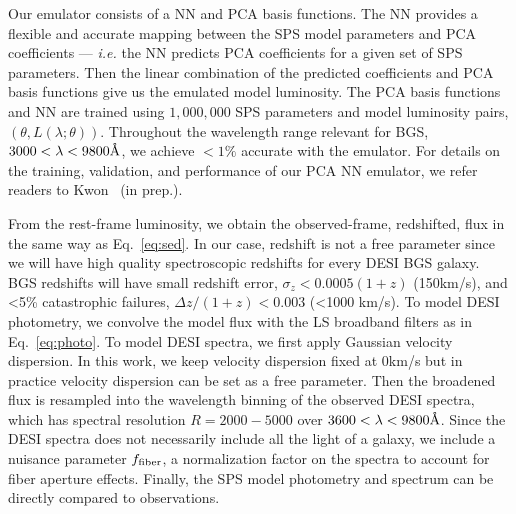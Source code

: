 Our emulator consists of a NN and PCA basis functions. 
The NN provides a flexible and accurate mapping between the SPS model
parameters and PCA coefficients --- \emph{i.e.} the NN predicts PCA
coefficients for a given set of SPS parameters. 
Then the linear combination of the predicted coefficients and PCA basis
functions give us the emulated model luminosity. 
The PCA basis functions and NN are trained using $1,000,000$ SPS parameters and
model luminosity pairs, $(\theta, L(\lambda;\theta))$. 
Throughout the wavelength range relevant for BGS, $3000 < \lambda < 9800\AA$,
we achieve $< 1\%$ accurate with the emulator. 
For details on the training, validation, and performance of our PCA NN
emulator, we refer readers to Kwon \etal~(in prep.). 

From the rest-frame luminosity, we obtain the observed-frame, redshifted, flux
in the same way as Eq.~\ref{eq:sed}.
In our case, redshift is not a free parameter since we will have high quality
spectroscopic redshifts for every DESI BGS galaxy.
BGS redshifts will have small redshift error, $\sigma_z < 0.0005 (1+z)$
(150km/s), and <5\% catastrophic failures, $\Delta z/(1+z) < 0.003$ (<1000
km/s).
To model DESI photometry, we convolve the model flux with the LS broadband
filters as in Eq.~\ref{eq:photo}.
To model DESI spectra, we first apply Gaussian velocity dispersion. 
In this work, we keep velocity dispersion fixed at 0km/s but in practice
velocity dispersion can be set as a free parameter. 
Then the broadened flux is resampled into the wavelength binning of the
observed DESI spectra, which has spectral resolution $R = 2000 - 5000$ over
$3600 < \lambda < 9800\AA$. 
Since the DESI spectra does not necessarily include all the light of a galaxy,
we include a nuisance parameter $f_{\rm fiber}$, a normalization factor on the
spectra to account for fiber aperture effects. 
Finally, the SPS model photometry and spectrum can be directly compared to
observations.

